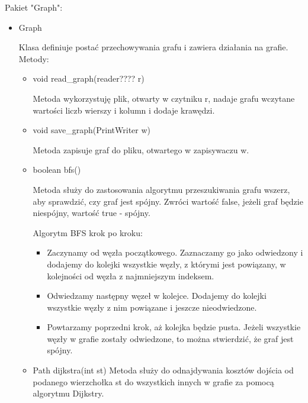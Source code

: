 \documentclass[]{article}
\begin{document}
Pakiet "Graph":
\begin{itemize}
    \item Graph
    
    Klasa definiuje postać przechowywania grafu i zawiera działania na grafie.
    Metody:
    \begin{itemize}
        \item void read\_graph(reader???? r)
        
        Metoda wykorzystuję plik, otwarty w czytniku r, nadaje grafu wczytane wartości liczb wierszy i kolumn i dodaje krawędzi.
        \item void save\_graph(PrintWriter w)
        
        Metoda zapisuje graf do pliku, otwartego w zapisywaczu w.
        \item boolean bfs()
        
        Metoda służy do zastosowania algorytmu przeszukiwania grafu wszerz, aby sprawdzić, czy graf jest spójny. Zwróci wartość false, jeżeli graf będzie niespójny, wartość true - spójny.
        
        Algorytm BFS krok po kroku:
        \begin{itemize}
            \item Zaczynamy od węzła początkowego. Zaznaczamy go jako odwiedzony i dodajemy do kolejki wszystkie węzły, z którymi jest powiązany, w kolejności od węzła z najmniejszym indeksem.
            \item Odwiedzamy następny węzeł w kolejce. Dodajemy do kolejki wszystkie węzły z nim powiązane i jeszcze nieodwiedzone.
            \item Powtarzamy poprzedni krok, aż kolejka będzie pusta. Jeżeli wszystkie węzły w grafie zostały odwiedzone, to można stwierdzić, że graf jest spójny.
        \end{itemize}
        \item Path dijkstra(int st)
        Metoda służy do odnajdywania kosztów dojścia od podanego wierzchołka st do wszystkich innych w grafie za pomocą algorytmu Dijkstry.
        

\end{itemize}
\end{itemize}
\end{document}
